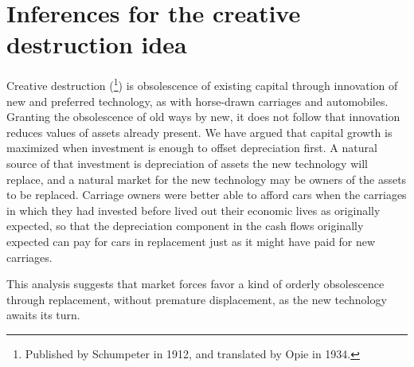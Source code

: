 \documentclass[a4padisinvitingper,fleqn]{latex_styles/cas-sc}
\begin{document}
\section{Inferences for the creative destruction idea}\label{inferences-for-the-creative-destruction-idea}

Creative destruction (\cite{schumpeter1912}\footnote{Published by Schumpeter in 1912, and translated by Opie in 1934.}) is
obsolescence of existing capital through innovation of new and preferred
technology, as with horse-drawn carriages and automobiles. Granting the
obsolescence of old ways by new, it does not follow that innovation reduces
values of assets already present. We have argued that
capital growth is maximized when investment is enough to offset depreciation first. A natural source
of that investment is depreciation of assets the new technology will replace,
and a natural market for the new technology may be owners of the assets to be
replaced. Carriage owners were better able to afford cars when the carriages in
which they had invested  before lived out their economic lives as originally
expected, so that the depreciation component in the cash flows originally
expected can pay for cars in replacement just as it might have paid for new
carriages. 

This analysis suggests that market forces favor a kind of orderly obsolescence
through replacement, without premature displacement, as the new technology awaits its turn.
\end{document}
